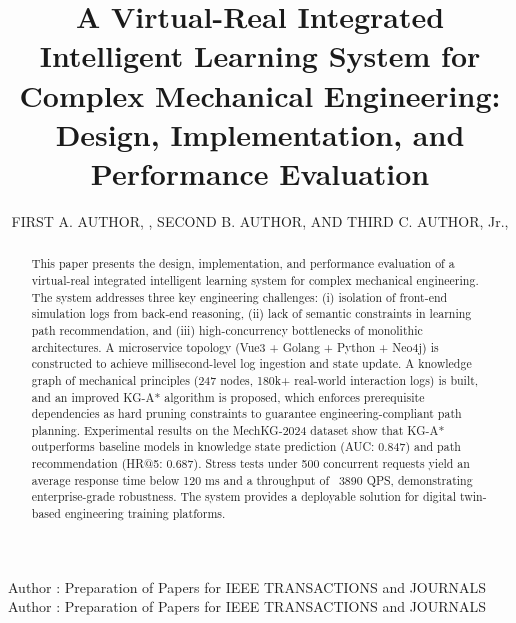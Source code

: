 \documentclass{ieeeaccess}
\begin{document}

\title{A Virtual-Real Integrated Intelligent Learning System for Complex Mechanical Engineering: Design, Implementation, and Performance Evaluation}
\author{\uppercase{First A. Author}, ,
\uppercase{Second B. Author}, AND \uppercase{Third C. Author},
Jr.,
}

\address[1]{National Institute of Standards and
Technology, Boulder, CO 80305 USA (e-mail: author@boulder.nist.gov)}
\address[2]{Department of Physics, Colorado State University, Fort Collins,
CO 80523 USA (e-mail: author@lamar.colostate.edu)}
\address[3]{Electrical Engineering Department, University of Colorado, Boulder, CO
80309 USA}

\markboth
{Author \headeretal: Preparation of Papers for IEEE TRANSACTIONS and JOURNALS}
{Author \headeretal: Preparation of Papers for IEEE TRANSACTIONS and JOURNALS}



\begin{abstract}
This paper presents the design, implementation, and performance evaluation of a virtual-real integrated intelligent learning system for complex mechanical engineering. 
The system addresses three key engineering challenges: (i) isolation of front-end simulation logs from back-end reasoning, (ii) lack of semantic constraints in learning path recommendation, and (iii) high-concurrency bottlenecks of monolithic architectures. A microservice topology (Vue3 + Golang + Python + Neo4j) is constructed to achieve millisecond-level log ingestion and state update. A knowledge graph of mechanical principles (247 nodes, 180k+ real-world interaction logs) is built, and an improved KG-A* algorithm is proposed, which enforces prerequisite dependencies as hard pruning constraints to guarantee engineering-compliant path planning. Experimental results on the MechKG-2024 dataset show that KG-A* outperforms baseline models in knowledge state prediction (AUC: 0.847) and path recommendation (HR@5: 0.687). Stress tests under 500 concurrent requests yield an average response time below 120 ms and a throughput of ~3890 QPS, demonstrating enterprise-grade robustness. The system provides a deployable solution for digital twin-based engineering training platforms.
\end{abstract}
\end{document}
